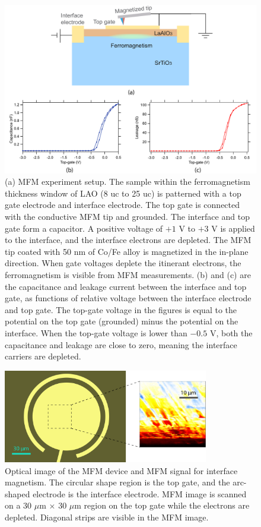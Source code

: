 \documentclass[pdflatex, sectionletters, 12pt, final, phd]{pittetd}    %
\begin{document}
\begin{figure}[p]
	\centering
	\includegraphics[width=1.0\textwidth]{Drawing/LAOSTOMFM.pdf}
	\caption[MFM experiment]{(a) MFM experiment setup. The sample within the ferromagnetism thickness window of LAO (8 uc to 25 uc) is patterned with a top gate electrode and interface electrode. The top gate is connected with the conductive MFM tip and grounded. The interface and top gate form a capacitor. A positive voltage of $+1$ V to $+3$ V is applied to the interface, and the interface electrons are depleted. The MFM tip coated with 50 nm of Co/Fe alloy is magnetized in the in-plane direction. When gate voltages deplete the itinerant electrons, the ferromagnetism is visible from MFM measurements. (b) and (c) are the capacitance and leakage current between the interface and top gate, as functions of relative voltage between the interface electrode and top gate. The top-gate voltage in the figures is equal to the potential on the top gate (grounded) minus the potential on the interface. When the top-gate voltage is lower than $-0.5$ V, both the capacitance and leakage are close to zero, meaning the interface carriers are depleted.}
	\label{FIG:LAOSTOMFM}
\end{figure}

\begin{figure}[h!]
	\centering
	\includegraphics[width=0.8\textwidth]{Drawing/MFMSignal.pdf}
	\caption[Optical image of the MFM device and MFM signal for interface magnetism]{Optical image of the MFM device and MFM signal for interface magnetism. The circular shape region is the top gate, and the arc-shaped electrode is the interface electrode. MFM image is scanned on a 30 $\mu$m $
		\times$ 30 $\mu$m region on the top gate while the electrons are depleted. Diagonal strips are visible in the MFM image.}
	\label{FIG:MFMSignal}
\end{figure}
\end{document}
